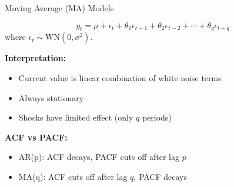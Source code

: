 \documentclass[aspectratio=169]{beamer}
\begin{document}
\begin{frame}{Moving Average (MA) Models}
  \begin{definitionbox}[title={MA(q) Model}]
    \begin{equation}
      y_t = \mu + \epsilon_t + \theta_1 \epsilon_{t-1} + \theta_2 \epsilon_{t-2} + \cdots + \theta_q \epsilon_{t-q}
    \end{equation}
    where $\epsilon_t \sim \text{WN}(0, \sigma^2)$.
  \end{definitionbox}

  \vspace{0.5em}

  \textbf{Interpretation:}
  \begin{itemize}
    \item Current value is linear combination of white noise terms
    \item Always stationary
    \item Shocks have limited effect (only $q$ periods)
  \end{itemize}

  \vspace{0.5em}

  \textbf{ACF vs PACF:}
  \begin{itemize}
    \item AR(p): ACF decays, PACF cuts off after lag $p$
    \item MA(q): ACF cuts off after lag $q$, PACF decays
  \end{itemize}
\end{frame}
\end{document}

